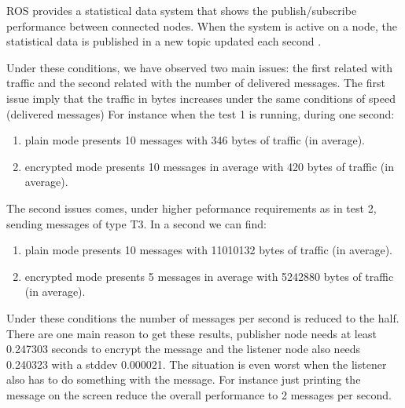 \documentclass[journal,twoside]{JoPhA}
\begin{document}
ROS provides a statistical data system that shows the publish/subscribe performance between 
connected nodes. When the system is active on a node, the statistical data is published in a new topic updated each second .%

Under these conditions, we have observed two main issues: the first related with traffic and the second related with the number of delivered messages. The first issue imply that the traffic in bytes increases under the same conditions of speed (delivered messages) For instance when the test 1 is running, during one second: 
\begin{enumerate}
	\item plain mode presents  10 messages  with 346 bytes of traffic (in average).
	\item encrypted mode presents 10 messages in average with 420 bytes of traffic (in average).
\end{enumerate}

The second issues comes, under higher peformance requirements as in test 2, sending messages of type T3. In a second we can find:
\begin{enumerate}
	\item plain mode presents  10 messages  with 11010132 bytes of traffic (in average).
	\item encrypted mode presents 5 messages in average with 5242880 bytes of traffic (in average).
\end{enumerate}




Under these conditions the number of messages per second is reduced to the half. There are one main reason  to get these results, publisher node needs at least 0.247303 seconds to encrypt the message and the listener node also needs 0.240323 with a stddev 0.000021. The situation is even worst when the listener also has to do something with the message. For instance just printing the message on the screen reduce the overall performance to 2 messages per second. 

%
%
\end{document}
